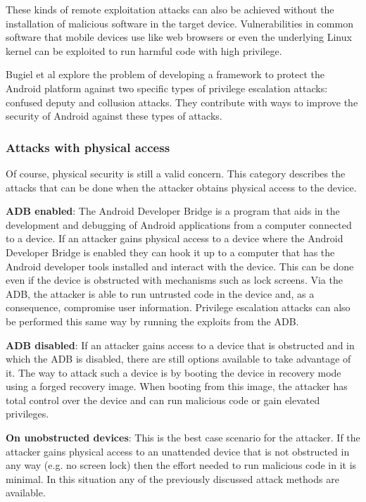\documentclass{sig-alternate}
\begin{document}
These kinds of remote exploitation attacks can also be achieved without the installation of malicious software in the target device. Vulnerabilities in common software that mobile devices use like web browsers or even the underlying Linux kernel can be exploited to run harmful code with high privilege.

Bugiel et al \cite{bugiel2012towards} explore the problem of developing a framework to protect the Android platform against two specific types of privilege escalation attacks: confused deputy and collusion attacks. They contribute with ways to improve the security of Android against these types of attacks.

\subsubsection{Attacks with physical access}

Of course, physical security is still a valid concern. This category describes the attacks that can be done when the attacker obtains physical access to the device.

\textbf{ADB enabled}: The Android Developer Bridge is a program that aids in the development and debugging of Android applications from a computer connected to a device. If an attacker gains physical access to a device where the Android Developer Bridge is enabled they can hook it up to a computer that has the Android developer tools installed and interact with the device. This can be done even if the device is obstructed with mechanisms such as lock screens. Via the ADB, the attacker is able to run untrusted code in the device and, as a consequence, compromise user information. Privilege escalation attacks can also be performed this same way by running the exploits from the ADB.

\textbf{ADB disabled}: If an attacker gains access to a device that is obstructed and in which the ADB is disabled, there are still options available to take advantage of it. The way to attack such a device is by booting the device in recovery mode using a forged recovery image. When booting from this image, the attacker has total control over the device and can run malicious code or gain elevated privileges.

\textbf{On unobstructed devices}: This is the best case scenario for the attacker. If the attacker gains physical access to an unattended device that is not obstructed in any way (e.g. no screen lock) then the effort needed to run malicious code in it is minimal. In this situation any of the previously discussed attack methods are available.
\end{document}
